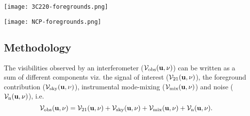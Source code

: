 \documentclass[fleqn,usenatbib]{mnras}
\begin{document}
\begin{figure*}
\centering
\texttt{[image: 3C220-foregrounds.png]}
    \caption{The 3C220 field Stokes $I$ image cube slices (in brightness temperature units) across the center of a spatial axis after different processing steps. The left panel shows a slice of the image cube after DD-calibration (data). The middle panel shows the GPR model of the smooth foregrounds (intrinsic + mode-mixing) corresponding to the data. The right panel shows the residuals after subtracting the GPR model from the data. The dashed black lines represent the frequency range ($54-68$ MHz) used for power spectrum estimation. The residuals after GPR are noise-like except for a few outliers.} 
\label{fig:3C220-foregrounds}
\end{figure*} 

\begin{figure*}
\centering
\texttt{[image: NCP-foregrounds.png]}
    \caption{As figure \ref{fig:3C220-foregrounds} but for the NCP field. Similar to the 3C220 field, the residuals in the NCP field after GPR are noise-like.} 
\label{fig:NCP-foregrounds}
\end{figure*} 

\subsection{Methodology}\label{subsec:GPR-method}

The visibilities observed by an interferometer ($\mathcal{V}_{\text{obs}}(\textit{\bf u},\nu)$) can be written as a sum of different components viz. the signal of interest ($\mathcal{V}_{21}(\textit{\bf u},\nu)$), the foreground contribution ($\mathcal{V}_{\text{sky}}(\textit{\bf u},\nu)$), instrumental mode-mixing ($\mathcal{V}_{\text{mix}}(\textit{\bf u},\nu)$) and noise ($\mathcal{V}_{\text{n}}(\textit{\bf u},\nu)$), i.e.
\begin{equation}
\mathcal{V}_{\text{obs}}( \textit{\bf u} ,\nu) = \mathcal{V}_{21}(\textit{\bf u},\nu) + \mathcal{V}_{\text{sky}}(\textit{\bf u},\nu) + \mathcal{V}_{\text{mix}}(\textit{\bf u},\nu) + \mathcal{V}_{\text{n}}(\textit{\bf u},\nu).
\end{equation}
\end{document}
